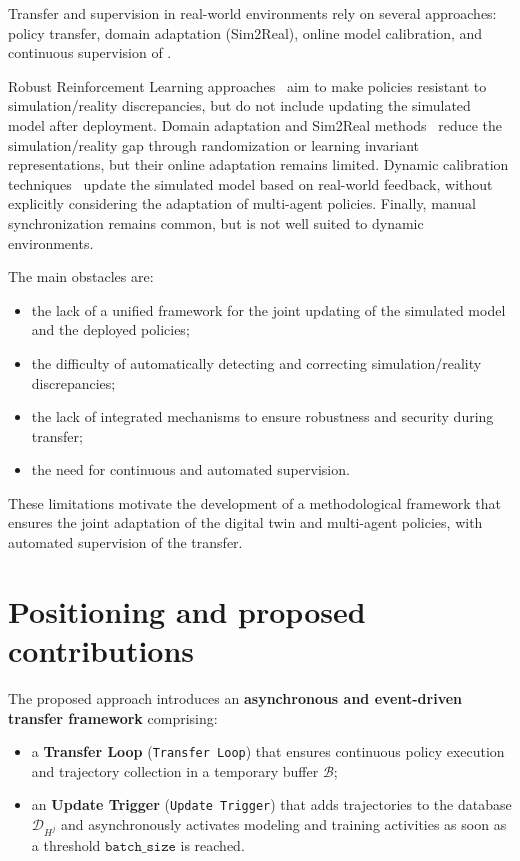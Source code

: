 Transfer and supervision in real-world environments rely on several approaches: policy transfer, domain adaptation (Sim2Real), online model calibration, and continuous supervision of .

Robust Reinforcement Learning approaches~\cite{pinto2017robust} aim to make policies resistant to simulation/reality discrepancies, but do not include updating the simulated model after deployment. Domain adaptation and Sim2Real methods~\cite{tobin2017domain,ganin2016domain} reduce the simulation/reality gap through randomization or learning invariant representations, but their online adaptation remains limited. Dynamic calibration techniques~\cite{deisenroth2011pilco} update the simulated model based on real-world feedback, without explicitly considering the adaptation of multi-agent policies. Finally, manual synchronization remains common, but is not well suited to dynamic environments.

The main obstacles are:
\begin{itemize}
  \item the lack of a unified framework for the joint updating of the simulated model and the deployed policies;
  \item the difficulty of automatically detecting and correcting simulation/reality discrepancies;
  \item the lack of integrated mechanisms to ensure robustness and security during transfer;
  \item the need for continuous and automated supervision.
\end{itemize}

These limitations motivate the development of a methodological framework that ensures the joint adaptation of the digital twin and multi-agent policies, with automated supervision of the transfer.

\section{Positioning and proposed contributions}

The proposed approach introduces an \textbf{asynchronous and event-driven transfer framework} comprising:
\begin{itemize}
  \item a \textbf{Transfer Loop} (\texttt{Transfer Loop}) that ensures continuous policy execution and trajectory collection in a temporary buffer $\mathcal{B}$;
  \item an \textbf{Update Trigger} (\texttt{Update Trigger}) that adds trajectories to the database $\mathcal{D}_{H^j}$ and asynchronously activates modeling and training activities as soon as a threshold $\texttt{batch\_size}$ is reached.
\end{itemize}


